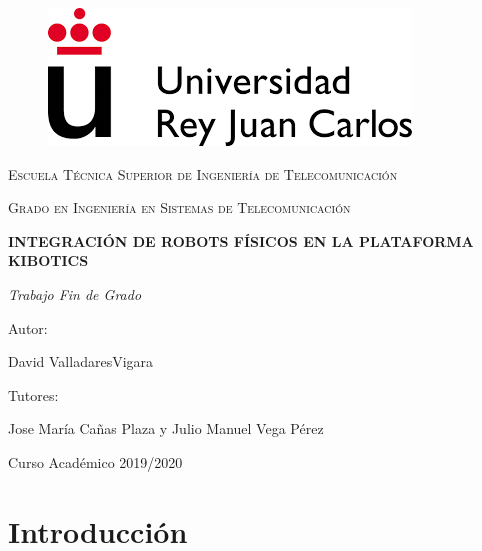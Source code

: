 \documentclass{report}
\begin{document}
\begin{titlepage}
\centering

\begin{figure}[t]
\includegraphics[scale=0.5]{images/urjc_logo.png}
\centering
\vspace{0.5cm} %
\end{figure}

{\scshape\Large Escuela Técnica Superior de Ingeniería de Telecomunicación \par}
\vspace{1cm}
{\scshape\Large Grado en Ingeniería en Sistemas de Telecomunicación \par}
\vspace{3cm}
{\bfseries\LARGE INTEGRACIÓN DE ROBOTS FÍSICOS EN LA PLATAFORMA KIBOTICS \par}
\vspace{3cm}
{\itshape\Large Trabajo Fin de Grado \par}
\vfill
{\Large Autor: }
{\Large David ValladaresVigara \par}
{\Large Tutores: }
{\Large Jose María Cañas Plaza y Julio Manuel Vega Pérez \par}
\vfill
{\Large Curso Académico 2019/2020 \par}
\end{titlepage} 

\renewcommand{\abstractname}{\Large Resumen}
\begin{abstract}



\end{abstract}

\setcounter{tocdepth}{3} %
\renewcommand{\contentsname}{Índice general}
\tableofcontents
\clearpage

\renewcommand{\listfigurename}{Índice de figuras}
\listoffigures

\renewcommand{\listtablename}{Índice de tablas}
\listoftables

\renewcommand{\lstlistingname}{Fragmento}

\renewcommand{\chaptername}{Capítulo}
\chapter{Introducción}
\end{document}
